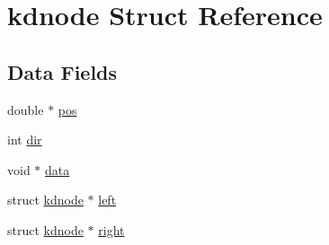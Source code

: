 \hypertarget{structkdnode}{\section{kdnode Struct Reference}
\label{structkdnode}
}
\subsection*{Data Fields}
\begin{DoxyCompactItemize}
\item 
double $\ast$ \hyperlink{structkdnode_af92e7d95a2845d3e8611b289d6398a83}{pos}
\item 
int \hyperlink{structkdnode_aa3b02f2e7995f08cd16a85ea93e1fc80}{dir}
\item 
void $\ast$ \hyperlink{structkdnode_ac14038f51e15cb1bb26abe6558d36a3d}{data}
\item 
struct \hyperlink{structkdnode}{kdnode} $\ast$ \hyperlink{structkdnode_a5011f2e53a829b362c8d034f005e6a04}{left}
\item 
struct \hyperlink{structkdnode}{kdnode} $\ast$ \hyperlink{structkdnode_a560fdae1b98325057e95c817f76bee67}{right}
\end{DoxyCompactItemize}



